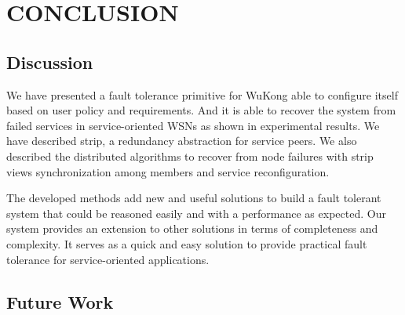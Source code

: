 \cleardoublepage
\singlespacing
\chapter{CONCLUSION}
\label{c:conclusion}
\doublespacing\nointerlineskip


\section{Discussion}

We have presented a fault tolerance primitive for WuKong able to configure itself
based on user policy and requirements. And it is able to recover the system from failed
services in service-oriented WSNs as shown in experimental results. We
have described strip, a redundancy abstraction for service peers. We also
described the distributed algorithms to recover from node failures with strip
views synchronization among members and service reconfiguration.

The developed methods add new and useful solutions to build a fault tolerant
system that could be reasoned easily and with a performance as expected. Our
system provides an extension to other solutions in terms of completeness and
complexity. It serves as a quick and easy solution to provide practical fault
tolerance for service-oriented applications.



\section{Future Work}



